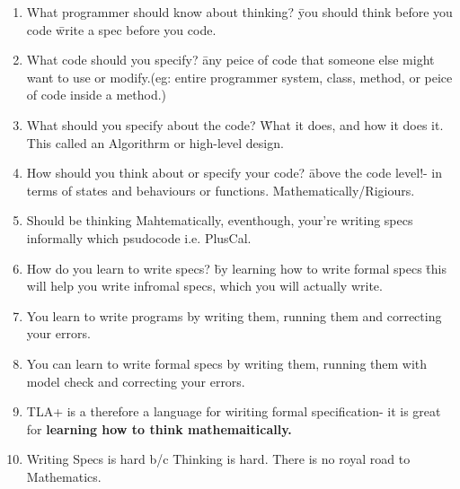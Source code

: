 \documentclass{article}
\begin{document}
\begin{enumerate}
        \item What programmer should know about thinking? \= you should think before you code \= write a spec before you code.    
        \item What code should you specify? \= any peice of code that someone else might want to use or modify.(eg: entire programmer system, class, method, or peice of code inside a method.)
        \item What should you specify about the code? \= What it does, and how it does it. This called an Algorithrm or high-level design. 
        \item How should you think about or specify your code? \= above the code level!- in terms of states and behaviours or functions. Mathematically/Rigiours. 
        \item Should be thinking Mahtematically, eventhough, your're writing specs informally which psudocode i.e. PlusCal.
        \item How do you learn to write specs? \= by learning how to write formal specs \= this will help you write infromal specs, which you will actually write.
        \item You learn to write programs by writing them, running them and correcting your errors.
        \item You can learn to write formal specs by writing them, running them with model check and correcting your errors.
        \item TLA+ is a therefore a language for wiriting formal specification- it is great for \textbf{learning how to think mathemaitically.}
        \item Writing Specs is hard b/c Thinking is hard. There is no royal road to Mathematics.
    \end{enumerate}
\end{document}
